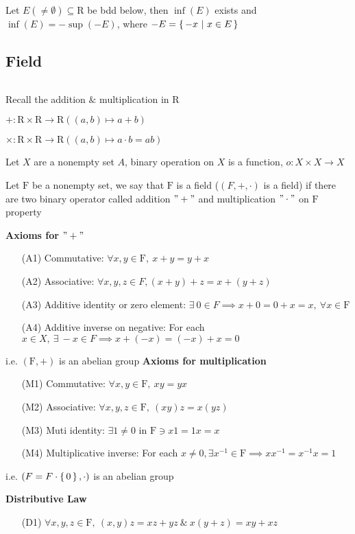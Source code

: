 \newpage

\begin{rmk*}
	Let $E(\neq \emptyset) \subseteq \mathrm{R}$ be bdd below, then $\inf (E)$ exists and $\inf(E) = -\sup(-E)$, where $-E = \left\{ \,-x ~|~x \in E \,\right\}$
\end{rmk*}

\subsection{Field} $ $
 
Recall the addition $\&$ multiplication in $\mathrm{R}$

$+ : \mathrm{R} \times \mathrm{R} \rightarrow \mathrm{R}((a,b)\mapsto a+b)$

$\times : \mathrm{R} \times \mathrm{R} \rightarrow \mathrm{R}((a,b)\mapsto a \cdot b = ab)$

\begin{defn}
	Let $X$ are a nonempty set $A$, binary operation on $X$ is a function, $o:X\times X \rightarrow X$
\end{defn}


\begin{defn}
	Let $\mathrm{F}$ be a nonempty set, we say that $\mathrm{F}$ is a field ($(F,+,\cdot)$ is a field) if there are two binary operator called addition $"+"$ and multiplication $"\cdot"$ on $\mathrm{F}$ property
	
	\textbf{Axioms for $"+"$}
	\begin{enumerate}
		\item[(A1)] Commutative: $\forall x,y \in \mathrm{F},~x+y=y+x$
		\item[(A2)] Associative: $\forall x,y,z \in F, (x+y)+z = x+(y+z)$
		\item[(A3)] Additive identity or zero element: $\exists~ 0 \in F \implies x + 0 = 0 + x = x ,~\forall x \in \mathrm{F}$
		\item[(A4)] Additive inverse on negative: For each $x \in X,~ \exists~-x \in F \implies x + (-x) = (-x) + x = 0$
	\end{enumerate}
	i.e. $(\mathrm{F},+)$ is an abelian group
	\textbf{Axioms for multiplication}
	\begin{enumerate}
		\item[(M1)] Commutative: $\forall x,y \in \mathrm{F},~xy=yx$
		\item[(M2)] Associative: $\forall x,y,z \in \mathrm{F},~(xy)z = x(yz)$
		\item[(M3)] Muti identity: $\exists 1 \neq 0$ in $\mathrm{F} \ni x1 = 1x = x$
		\item[(M4)] Multiplicative inverse: For each $x \neq 0, \exists x^{-1} \in \mathrm{F} \implies xx^{-1} = x^{-1}x = 1$
	\end{enumerate}
	i.e. $(F = F\cdot \left\{ \,0 \,\right\},\cdot)$ is an abelian group
	
	\textbf{Distributive Law}
	\begin{enumerate}
		\item[(D1)] $\forall x,y,z \in \mathrm{F},~(x,y)z = xz+yz ~\&~ x(y+z) = xy+xz$
	\end{enumerate}
	
	
\end{defn}


